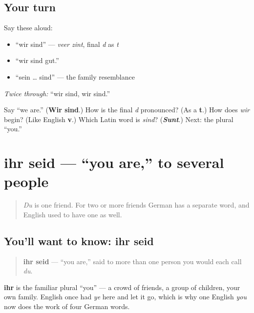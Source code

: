 \subsection*{Your turn}
Say these aloud:

\begin{itemize}
\raggedright
  \item \textquotedblleft{}wir sind\textquotedblright{} — \emph{veer zint}, final \emph{d} as \emph{t}
  \item \textquotedblleft{}wir sind gut.\textquotedblright{}
  \item \textquotedblleft{}sein … sind\textquotedblright{} — the family resemblance
\end{itemize}

\emph{Twice through:} \textquotedblleft{}wir sind, wir sind.\textquotedblright{}

\begin{tcolorbox}[breakable,colback=teal!4,colframe=teal!35!black,title={Before you move on}]
Say \textquotedblleft{}we are.\textquotedblright{} (\textbf{Wir sind}.) How is the final \emph{d} pronounced? (As a \textbf{t}.) How does \emph{wir} begin? (Like English \textbf{v}.) Which Latin word is \emph{sind}? (\emph{\textbf{Sunt}}.) Next: the plural \textquotedblleft{}you.\textquotedblright{}
\end{tcolorbox}
\section[ihr seid]{ihr seid — \textquotedblleft{}you are,\textquotedblright{} to several people}

\label{lesson:GE-C16-ihr-seid}



\begin{quote}
\emph{Du} is one friend. For two or more friends German has a separate word, and English used to have one as well.
\end{quote}

\subsection*{You'll want to know: ihr seid}
\begin{quote}
\textbf{ihr seid} — \textquotedblleft{}you are,\textquotedblright{} said to more than one person you would each call \emph{du}.
\end{quote}

\textbf{ihr} is the familiar plural \textquotedblleft{}you\textquotedblright{} — a crowd of friends, a group of children, your own family. English once had \emph{ye} here and let it go, which is why one English \emph{you} now does the work of four German words.

